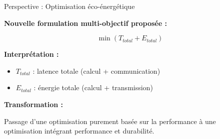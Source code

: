 \documentclass[aspectratio=169]{beamer}
\begin{document}
\begin{frame}{Perspective : Optimisation éco-énergétique}

\textbf{Nouvelle formulation multi-objectif proposée :}

\[
\min \left( T_{total} + E_{total} \right)
\]

\textbf{Interprétation :}
\begin{itemize}
    \item $T_{total}$ : latence totale (calcul + communication)
    \item $E_{total}$ : énergie totale (calcul + transmission)
\end{itemize}

\textbf{Transformation :}

\begin{block}{}
Passage d’une optimisation purement basée sur la performance  
à une optimisation intégrant performance et durabilité.
\end{block}
\end{frame}
\end{document}

